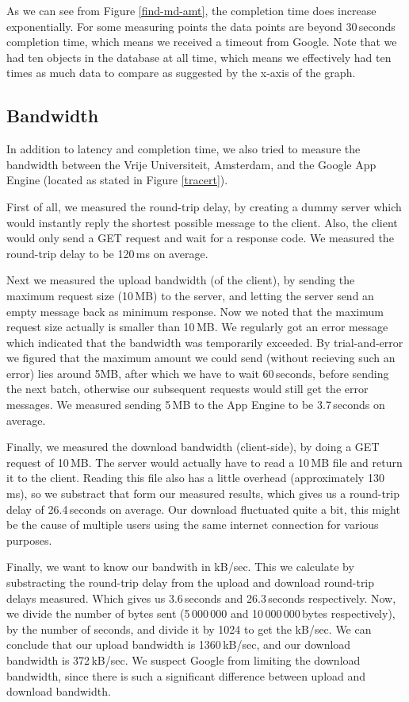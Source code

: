 As we can see from Figure \ref{find-md-amt}, the completion time does increase
exponentially. For some measuring points the data points are beyond 30\,seconds
completion time, which means we received a timeout from Google. Note that we had
ten objects in the database at all time, which means we effectively had ten times
as much data to compare as suggested by the x-axis of the graph.

\subsection{Bandwidth}
In addition to latency and completion time, we also tried to measure the
bandwidth between the Vrije Universiteit, Amsterdam, and the Google App Engine
(located as stated in Figure \ref{tracert}).

First of all, we measured the round-trip delay, by creating a dummy server
which would instantly reply the shortest possible message to the client. Also,
the client would only send a GET request and wait for a response code. We
measured the round-trip delay to be 120\,ms on average.

Next we measured the upload bandwidth (of the client), by sending the maximum
request size (10\,MB) to the server, and letting the server send an empty message
back as minimum response. Now we noted that the maximum request size actually is
smaller than 10\,MB. We regularly got an error message which indicated that the
bandwidth was temporarily exceeded. By trial-and-error we figured that the
maximum amount we could send (without recieving such an error) lies around 5MB,
after which we have to wait 60\,seconds, before sending the next batch,
otherwise our subsequent requests would still get the error messages. We measured
sending 5\,MB to the App Engine to be 3.7\,seconds on average.

Finally, we measured the download bandwidth (client-side), by doing a GET
request of 10\,MB. The server would actually have to read a 10\,MB file and
return it to the client. Reading this file also has a little overhead (approximately
130\,ms), so we substract that form our measured results, which gives us a
round-trip delay of 26.4\,seconds on average. Our download fluctuated quite a
bit, this might be the cause of multiple users using the same internet connection
for various purposes.

Finally, we want to know our bandwith in kB/sec. This we calculate by
substracting the round-trip delay from the upload and download round-trip delays
measured. Which gives us 3.6\,seconds and 26.3\,seconds respectively. Now, we
divide the number of bytes sent (5\,000\,000 and 10\,000\,000\,bytes
respectively), by the number of seconds, and divide it by 1024 to get the kB/sec.
We can conclude that our upload bandwidth is 1360\,kB/sec, and our download
bandwidth is 372\,kB/sec. We suspect Google from limiting the download
bandwidth, since there is such a significant difference between upload and
download bandwidth.

